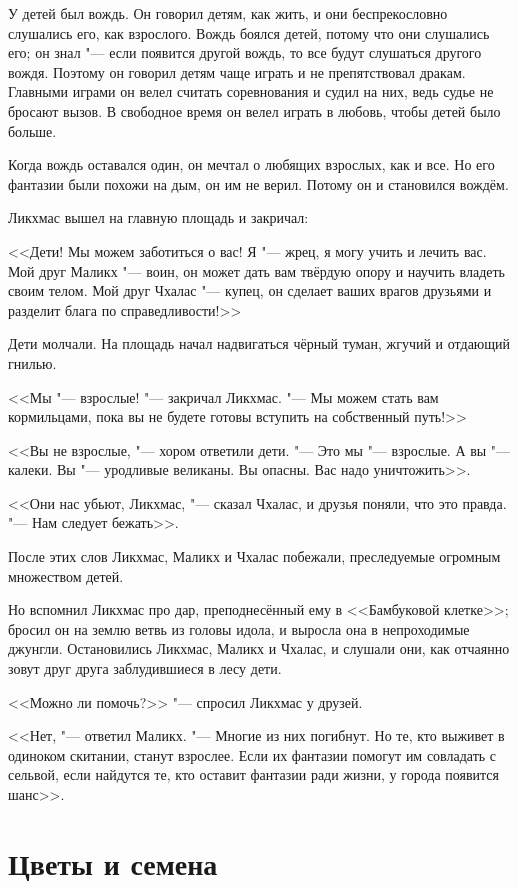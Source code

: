 У детей был вождь.
Он говорил детям, как жить, и они беспрекословно слушались его, как взрослого.
Вождь боялся детей, потому что они слушались его;
он знал "--- если появится другой вождь, то все будут слушаться другого вождя.
Поэтому он говорил детям чаще играть и не препятствовал дракам.
Главными играми он велел считать соревнования и судил на них, ведь судье не бросают вызов.
В свободное время он велел играть в любовь, чтобы детей было больше.

Когда вождь оставался один, он мечтал о любящих взрослых, как и все.
Но его фантазии были похожи на дым, он им не верил.
Потому он и становился вождём.

\spacing

Ликхмас вышел на главную площадь и закричал:

<<Дети!
Мы можем заботиться о вас!
Я "--- жрец, я могу учить и лечить вас.
Мой друг Маликх "--- воин, он может дать вам твёрдую опору и научить владеть своим телом.
Мой друг Чхалас "--- купец, он сделает ваших врагов друзьями и разделит блага по справедливости!>>

Дети молчали.
На площадь начал надвигаться чёрный туман, жгучий и отдающий гнилью.

<<Мы "--- взрослые! "--- закричал Ликхмас.
"--- Мы можем стать вам кормильцами, пока вы не будете готовы вступить на собственный путь!>>

<<Вы не взрослые, "--- хором ответили дети.
"--- Это мы "--- взрослые.
А вы "--- калеки.
Вы "--- уродливые великаны.
Вы опасны.
Вас надо уничтожить>>.

<<Они нас убьют, Ликхмас, "--- сказал Чхалас, и друзья поняли, что это правда.
"--- Нам следует бежать>>.

После этих слов Ликхмас, Маликх и Чхалас побежали, преследуемые огромным множеством детей.

Но вспомнил Ликхмас про дар, преподнесённый ему в <<Бамбуковой клетке>>;
бросил он на землю ветвь из головы идола, и выросла она в непроходимые джунгли.
Остановились Ликхмас, Маликх и Чхалас, и слушали они, как отчаянно зовут друг друга заблудившиеся в лесу дети.

<<Можно ли помочь?>> "--- спросил Ликхмас у друзей.

<<Нет, "--- ответил Маликх.
"--- Многие из них погибнут.
Но те, кто выживет в одиноком скитании, станут взрослее.
Если их фантазии помогут им совладать с сельвой, если найдутся те, кто оставит фантазии ради жизни, у города появится шанс>>.

\section{Цветы и семена}

